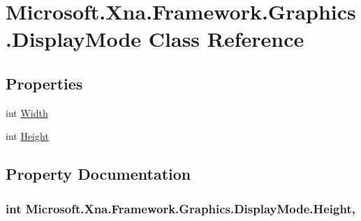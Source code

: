 \hypertarget{class_microsoft_1_1_xna_1_1_framework_1_1_graphics_1_1_display_mode}{}\section{Microsoft.\+Xna.\+Framework.\+Graphics.\+Display\+Mode Class Reference}
\label{class_microsoft_1_1_xna_1_1_framework_1_1_graphics_1_1_display_mode}
\subsection*{Properties}
\begin{DoxyCompactItemize}
\item 
int \hyperlink{class_microsoft_1_1_xna_1_1_framework_1_1_graphics_1_1_display_mode_a7f08e0a0110e1fae84bc64c34b3ce748}{Width}
\item 
int \hyperlink{class_microsoft_1_1_xna_1_1_framework_1_1_graphics_1_1_display_mode_acee65019b489833a6378033b0c5effaa}{Height}
\end{DoxyCompactItemize}


\subsection{Property Documentation}
\hypertarget{class_microsoft_1_1_xna_1_1_framework_1_1_graphics_1_1_display_mode_acee65019b489833a6378033b0c5effaa}{}
\subsubsection[{Height}]{\setlength{\rightskip}{0pt plus 5cm}int Microsoft.\+Xna.\+Framework.\+Graphics.\+Display\+Mode.\+Height\hspace{0.3cm}{\ttfamily [get]}, {\ttfamily [set]}}\label{class_microsoft_1_1_xna_1_1_framework_1_1_graphics_1_1_display_mode_acee65019b489833a6378033b0c5effaa}
\hypertarget{class_microsoft_1_1_xna_1_1_framework_1_1_graphics_1_1_display_mode_a7f08e0a0110e1fae84bc64c34b3ce748}{}
